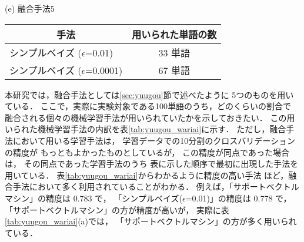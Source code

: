 \begin{table}[t]
\begin{minipage}[h]{20cm}
\vspace{0.5cm}

(e) 融合手法5

\begin{tabular}[c]{|l|c|}\hline
\multicolumn{1}{|c|}{手法} & \multicolumn{1}{|c|}{用いられた単語の数}  \\\hline
シンプルベイズ ($\epsilon$=0.01)  &  33 単語\\
シンプルベイズ ($\epsilon$=0.0001)  &  67 単語\\\hline
\end{tabular}

\end{minipage}


\end{table}


本研究では，融合手法としては\ref{sec:yuugou}節で述べたように
5つのものを用いている．
ここで，実際に実験対象である100単語のうち，どのくらいの割合で
融合される個々の機械学習手法が用いられていたかを示しておきたい．
この用いられた機械学習手法の内訳を表\ref{tab:yuugou_wariai}に示す．
ただし，融合手法において用いる学習手法は，
学習データでの10分割のクロスバリデーションの精度が
もっともよかったものとしているが，
この精度が同点であった場合は，
その同点であった学習手法のうち
表に示した順序で最初に出現した手法を用いている．
表\ref{tab:yuugou_wariai}からわかるように精度の高い手法
ほど，融合手法において多く利用されていることがわかる．
例えば，「サポートベクトルマシン」の精度は 0.783 で，
「シンプルベイズ($\epsilon$=0.01)」の精度は 0.778 で，
「サポートベクトルマシン」の方が精度が高いが，
実際に表\ref{tab:yuugou_wariai}(a)では，
「サポートベクトルマシン」の方が多く用いられている．


